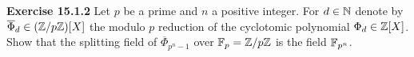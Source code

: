 \documentclass{article}
\begin{document}
\pagebreak

\begin{homeworkProblem}
    \textbf{Exercise 15.1.2} Let $p$ be a prime and $n$ a positive integer. 
    For $d \in \mathbb{N}$ denote by $\overline{\Phi}_d \in (\mathbb{Z} / p \mathbb{Z})[X]$ the modulo $p$ reduction of the cyclotomic polynomial $\Phi_d \in \mathbb{Z} [X]$.
    Show that the splitting field of $\overline{\Phi}_{p^n -1}$ over $\mathbb{F}_p = \mathbb{Z}/ p \mathbb{Z}$ is the field $\mathbb{F}_{p^n}$.\\
    \solution \\




\end{homeworkProblem}
\end{document}
